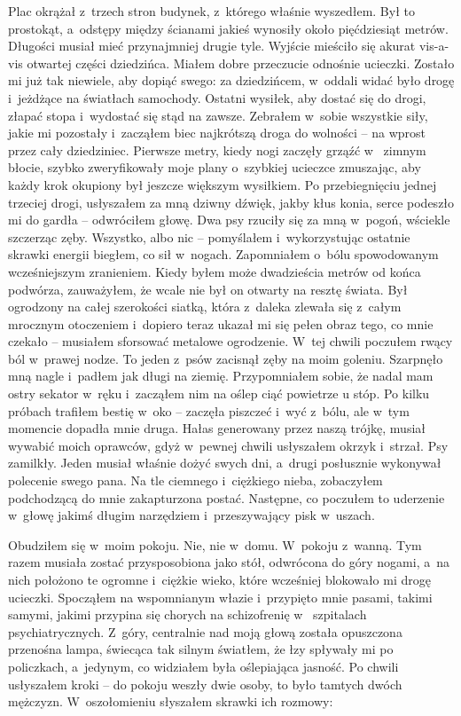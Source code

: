 Plac okrążał z~trzech stron budynek, z~którego właśnie wyszedłem. Był to prostokąt, a~odstępy między ścianami jakieś 
wynosiły około pięćdziesiąt metrów.  Długości musiał mieć przynajmniej drugie tyle. Wyjście mieściło się akurat vis-a-
vis otwartej części dziedzińca. Miałem dobre przeczucie odnośnie ucieczki. Zostało mi już tak niewiele, aby dopiąć 
swego: za dziedzińcem, w~oddali widać było drogę i~jeżdżące na światłach samochody. Ostatni wysiłek, aby dostać się 
do drogi, złapać stopa i~wydostać się stąd na zawsze. Zebrałem w~sobie wszystkie siły, jakie mi pozostały i~zacząłem 
biec najkrótszą droga do wolności -- na wprost przez cały dziedziniec. Pierwsze metry, kiedy nogi zaczęły grząźć w~
zimnym błocie, szybko zweryfikowały moje plany o~szybkiej ucieczce zmuszając, aby każdy krok okupiony był jeszcze 
większym wysiłkiem. Po przebiegnięciu jednej trzeciej drogi, usłyszałem za mną dziwny dźwięk, jakby kłus konia, serce 
podeszło mi do gardła -- odwróciłem głowę. Dwa psy rzuciły się za mną w~pogoń, wściekle szczerząc zęby. Wszystko, 
albo nic -- pomyślałem i~wykorzystując ostatnie skrawki energii biegłem, co sił w~nogach. Zapomniałem o~bólu 
spowodowanym wcześniejszym zranieniem. Kiedy byłem może dwadzieścia metrów od końca podwórza, zauważyłem, że wcale 
nie był on otwarty na resztę świata. Był ogrodzony na całej szerokości siatką, która z~daleka zlewała się z~całym 
mrocznym otoczeniem i~dopiero teraz ukazał mi się pełen obraz tego, co mnie czekało -- musiałem sforsować metalowe 
ogrodzenie. W~tej chwili poczułem rwący ból w~prawej nodze. To jeden z~psów zacisnął zęby na moim goleniu. Szarpnęło 
mną nagle i~padłem jak długi na ziemię. Przypomniałem sobie, że nadal mam ostry sekator w~ręku i~zacząłem nim na 
oślep ciąć powietrze u stóp. Po kilku próbach trafiłem bestię w~oko -- zaczęła piszczeć i~wyć z~bólu, ale w~tym 
momencie dopadła mnie druga. Hałas generowany przez naszą trójkę, musiał wywabić moich oprawców, gdyż w~pewnej chwili 
usłyszałem okrzyk i~strzał. Psy zamilkły. Jeden musiał właśnie dożyć swych dni, a~drugi posłusznie wykonywał 
polecenie swego pana. Na tle ciemnego i~ciężkiego nieba, zobaczyłem podchodzącą do mnie zakapturzona postać. 
Następne, co poczułem to uderzenie w~głowę jakimś długim narzędziem i~przeszywający pisk w~uszach.

Obudziłem się w~moim pokoju. Nie, nie w~domu. W~pokoju z~wanną. Tym razem musiała zostać przysposobiona jako stół, 
odwrócona do góry nogami, a~na nich położono te ogromne i~ciężkie wieko, które wcześniej blokowało mi drogę ucieczki. 
Spocząłem na wspomnianym włazie i~przypięto mnie pasami, takimi samymi, jakimi przypina się chorych na schizofrenię w~
szpitalach psychiatrycznych. Z~góry, centralnie nad moją głową została opuszczona przenośna lampa, świecąca tak 
silnym światłem, że łzy spływały mi po policzkach, a~jedynym, co widziałem była oślepiająca jasność. Po chwili 
usłyszałem kroki -- do pokoju weszły dwie osoby, to było tamtych dwóch mężczyzn. W~oszołomieniu słyszałem skrawki ich 
rozmowy: 

